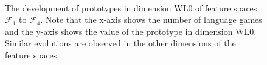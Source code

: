 \begin{figure}[t]
\centering
{}
\\
\caption{The development of prototypes in dimension WL0 of feature spaces ${\mathcal F}_1$ to ${\mathcal F}_4$. Note that the x-axis shows the number of language games and the y-axis shows the value of the prototype in dimension WL0. Similar evolutions are observed in the other dimensions of the feature spaces.}
\label{f:cat:evol1}
\end{figure}


